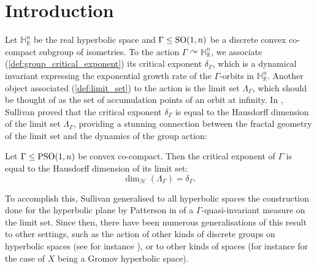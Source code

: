\documentclass{report}
\begin{document}
\chapter{Introduction}
Let $\mathbb H_{\mathbb R}^n$ be the real hyperbolic space and $\Gamma \leq \operatorname{{\mathrm{SO}}}(1, n)$ be a discrete convex co-compact subgroup of isometries.
To the action $\Gamma \curvearrowright \mathbb H_{\mathbb R}^n$, we associate (\cref{def:group_critical_exponent}) its critical exponent $\delta_\Gamma$, which is a dynamical invariant expressing the exponential growth rate of the $\Gamma$-orbits in $\mathbb H_{\mathbb R}^n$.
Another object associated (\cref{def:limit_set}) to the action is the limit set $\Lambda_\Gamma$, which should be thought of as the set of accumulation points of an orbit at infinity.
In \cite{sullivan1979density}, Sullivan proved that the critical exponent $\delta_\Gamma$ is equal to the Hausdorff dimension of the limit set $\Lambda_\Gamma$, providing a stunning connection between the fractal geometry of the limit set and the dynamics of the group action:
\begin{theorem}
    Let $\Gamma \leq \operatorname{{\mathrm{PSO}}}(1,n)$ be convex co-compact.
    Then the critical exponent of $\Gamma$ is equal to the Hausdorff dimension of its limit set:
    \[
    \dim_{\mathcal H}(\Lambda_\Gamma) = \delta_\Gamma.
    \]
\end{theorem}

To accomplish this, Sullivan generalised to all hyperbolic spaces the construction done for the hyperbolic plane by Patterson in \cite{patterson1976limit} of a $\Gamma$-quasi-invariant measure on the limit set.
Since then, there have been numerous generalisations of this result to other settings, such as the action of other kinds of discrete groups on hyperbolic spaces (see for instance \cite{roblin2003ergodicite,dal2000series,coornaert1993mesures}), or to other kinds of spaces (for instance \cite{coornaert1993mesures} for the case of $X$ being a Gromov hyperbolic space).
\end{document}
